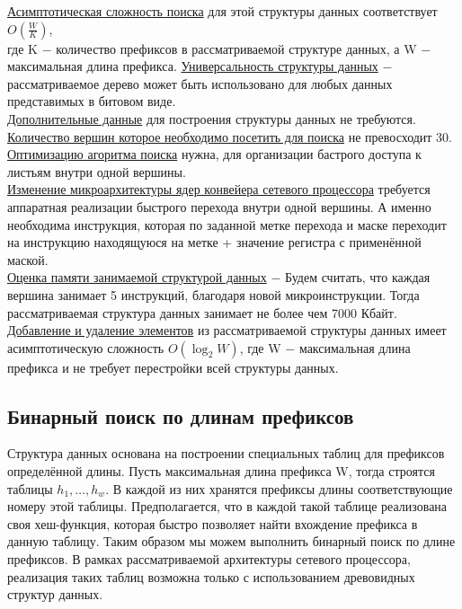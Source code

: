 \documentclass[a4peper, 12pt, titlepage, finall]{report}
\begin{document}
            \underline{Асимптотическая сложность поиска} для этой структуры данных соответствует {\ttfamily $O(\frac{W}{K})$},\\
            где {\ttfamily K} $-$ количество префиксов в рассматриваемой структуре данных, а {\ttfamily W} $-$ максимальная длина префикса.
            \underline{Универсальность структуры данных} $-$ рассматриваемое дерево может быть использовано для любых данных представимых в битовом виде.\\
            \underline{Дополнительные данные} для построения структуры данных не требуются.\\
            \underline{Количество вершин которое необходимо посетить для поиска} не превосходит 30.\\
            \underline{Оптимизацию агоритма поиска} нужна, для организации бастрого доступа к листьям внутри одной вершины.\\ 
            \underline{Изменение микроархитектуры ядер конвейера сетевого процессора} требуется аппаратная реализации быстрого перехода внутри одной вершины.
            А именно необходима инструкция, которая по заданной метке перехода и маске переходит на инструкцию находящуюся на метке + значение регистра с применённой маской.\\
            \underline{Оценка памяти занимаемой структурой данных} $-$ Будем считать, что каждая вершина занимает 5 инструкций, благодаря новой микроинструкции.
            Тогда рассматриваемая структура данных занимает не более чем 7000 Кбайт.\\
            \underline{Добавление и удаление элементов} из рассматриваемой структуры данных имеет асимптотическую сложность 
            {\ttfamily $O(\log_2{W})$}, где {\ttfamily W} $-$ максимальная длина префикса и не требует перестройки всей структуры данных.\\
            

        \subsection{Бинарный поиск по длинам префиксов}
            Структура данных основана на построении специальных таблиц для префиксов определённой длины. Пусть максимальная длина префикса {\ttfamily W}, 
            тогда строятся таблицы {\ttfamily $h_{1},\ldots,h_{w}$}. В каждой из них хранятся префиксы длины соответствующие номеру этой таблицы. Предполагается, 
            что в каждой такой таблице реализована своя хеш-функция, которая быстро позволяет найти вхождение префикса в данную таблицу.
            Таким образом мы можем выполнить бинарный поиск по длине префиксов. В рамках рассматриваемой архитектуры сетевого процессора, реализация таких таблиц возможна только
            с использованием древовидных структур данных.
\end{document}
